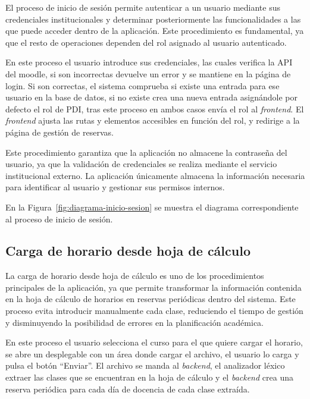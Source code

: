 El proceso de inicio de sesión permite autenticar a un usuario mediante sus credenciales institucionales y determinar posteriormente las funcionalidades a las que puede acceder dentro de la aplicación. Este procedimiento es fundamental, ya que el resto de operaciones dependen del rol asignado al usuario autenticado.

En este proceso el usuario introduce sus credenciales, las cuales verifica la API del moodle, si son incorrectas devuelve un error y se mantiene en la página de login. Si son correctas, el sistema comprueba si existe una entrada para ese usuario en la base de datos, si no existe crea una nueva entrada asignándole por defecto el rol de PDI, tras este proceso en ambos casos envía el rol al \textit{frontend}. El \textit{frontend} ajusta las rutas y elementos accesibles en función del rol, y redirige a la página de gestión de reservas.

Este procedimiento garantiza que la aplicación no almacene la contraseña del usuario, ya que la validación de credenciales se realiza mediante el servicio institucional externo. La aplicación únicamente almacena la información necesaria para identificar al usuario y gestionar sus permisos internos.

En la Figura~\ref{fig:diagrama-inicio-sesion} se muestra el diagrama correspondiente al proceso de inicio de sesión.


\subsection{Carga de horario desde hoja de cálculo}

La carga de horario desde hoja de cálculo es uno de los procedimientos principales de la aplicación, ya que permite transformar la información contenida en la hoja de cálculo de horarios en reservas periódicas dentro del sistema. Este proceso evita introducir manualmente cada clase, reduciendo el tiempo de gestión y disminuyendo la posibilidad de errores en la planificación académica.

En este proceso el usuario selecciona el curso para el que quiere cargar el horario, se abre un desplegable con un área donde cargar el archivo, el usuario lo carga y pulsa el botón ``Enviar''. El archivo se manda al \textit{backend}, el analizador léxico extraer las clases que se encuentran en la hoja de cálculo y el \textit{backend} crea una reserva periódica para cada día de docencia de cada clase extraída.

